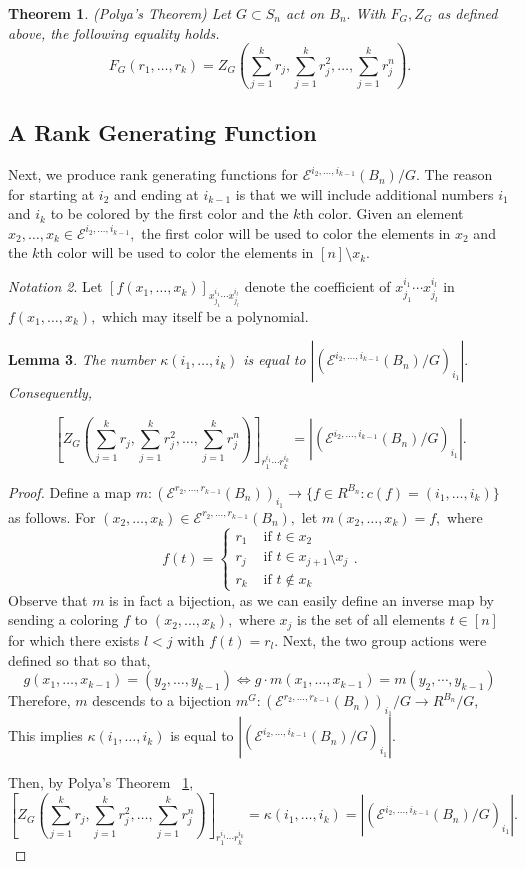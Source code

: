 \documentclass[10 pt]{amsart}
\theoremstyle{plain}
\newtheorem{thm}{Theorem}[section]
\newtheorem{lem}[thm]{Lemma}
\theoremstyle{definition}
\theoremstyle{remark}
\newtheorem{note}[thm]{Notation}
\numberwithin{equation}{section}
\newcommand\ssec{\subsection}
\renewcommand{\iff}{\Leftrightarrow}
\begin{document}
\begin{thm}
\label{thm:polya}
(Polya's Theorem)
 Let $G \subset S_n$ act on $B_n.$ With $F_G,Z_G$ as defined above, the following equality holds.
$$F_G(r_1,\ldots, r_k) = Z_G\left(\sum_{j=1}^k r_j,\sum_{j=1}^k r_j^2,\ldots, \sum_{j=1}^k r_j^n\right).$$
\end{thm}


\ssec{A Rank Generating Function}
Next, we produce rank generating functions for $\mathcal E^{i_2,\ldots,i_{k-1}}(B_n)/G.$ The reason for starting at $i_2$ and ending at $i_{k-1}$ is that we will include additional numbers $i_1$ and $i_k$ to be colored by the first color and the $k$th color. Given an element $x_2,\ldots,x_k \in \mathcal E^{i_2,\ldots, i_{k-1}},$ the first color will be used to color the elements in $x_2$ and the $k$th color will be used to color the elements in $[n]\setminus x_k.$

\begin{note}
Let $[f(x_1,\ldots, x_k)]_{x_{j_1}^{i_1}\cdots x_{j_l}^{i_l}}$ denote the coefficient of $x_{j_1}^{i_1}\cdots x_{j_l}^{i_l}$ in $f(x_1,\ldots, x_k),$ which may itself be a polynomial.
\end{note}

\begin{lem}
\label{lem:polya_faces_equivlence}
The number $\kappa(i_1,\ldots, i_k)$ is equal to $|(\mathcal E^{i_2,\ldots, i_{k-1}}(B_n)/G)_{i_1}|.$ Consequently, 

$$\left[Z_G \left(\sum_{j=1}^k r_j,\sum_{j=1}^k r_j^2,\ldots, \sum_{j=1}^k r_j^n \right)\right]_{r_1^{i_1} \cdots r_k^{i_k}}=|(\mathcal E^{i_2,\ldots, i_{k-1}}(B_n)/G)_{i_1}|.$$
\end{lem}
\begin{proof}
Define a map $m:(\mathcal E^{r_2,\ldots, r_{k-1}}(B_n))_{i_1} \rightarrow \{f \in R^{B_n}:c(f) =(i_1,\ldots, i_k)\}$ as follows. For $(x_2,\ldots, x_{k}) \in \mathcal E^{r_2,\ldots, r_{k-1}}(B_n),$ let $m(x_2,\ldots, x_{k}) = f,$ where 
$$f(t) = \begin{cases} r_1 &\text{ if } t\in x_2\\
r_j &\text{ if } t \in x_{j+1}\setminus x_j\\
r_k &\text{ if } t \notin x_k
\end{cases}.$$
Observe that $m$ is in fact a bijection, as we can easily define an inverse map by sending a coloring $f$ to $(x_2,\ldots, x_{k}),$ where $x_j$ is the set of all elements $t \in [n]$ for which there exists $l < j$ with $f(t) = r_l.$
Next, the two group actions were defined so that so that, 
$$g(x_1,\ldots, x_{k-1}) = (y_2,\ldots, y_{k-1}) \iff g\cdot m(x_1,\ldots, x_{k-1}) = m(y_2, \cdots, y_{k-1})$$
Therefore, $m$ descends to a bijection $m^G:(\mathcal E^{r_2,\ldots, r_{k-1}}(B_n))_{i_1}/G \rightarrow R^{B_n}/G,$ This implies $\kappa(i_1,\ldots, i_k)$ is equal to $|(\mathcal E^{i_2,\ldots, i_{k-1}}(B_n)/G)_{i_1}|.$ 

Then, by Polya's Theorem ~\ref{thm:polya},  
$$\left[Z_G\left(\sum_{j=1}^k r_j,\sum_{j=1}^k r_j^2,\ldots, \sum_{j=1}^k r_j^n\right)\right]_{r_1^{i_1} \cdots r_k^{i_k}}=\kappa(i_1,\ldots, i_k)=|(\mathcal E^{i_2,\ldots, i_{k-1}}(B_n)/G)_{i_1}|.$$
\end{proof}
\end{document}
